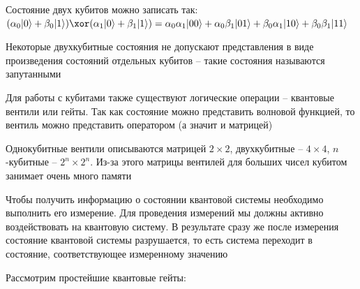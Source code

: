 \mediumvspace

Состояние двух кубитов можно записать так: $(\alpha_0 |0\rangle + \beta_0 |1\rangle) \xor (\alpha_1 |0\rangle + \beta_1 |1\rangle) = \alpha_0 \alpha_1 |00\rangle + \alpha_0 \beta_1 |01\rangle + \beta_0 \alpha_1 |10\rangle + \beta_0 \beta_1 |11\rangle$

Некоторые двухкубитные состояния не допускают представления в виде произведения состояний отдельных кубитов -- такие состояния называются запутанными


Для работы с кубитами также существуют логические операции -- квантовые вентили или гейты. Так как состояние можно представить волновой функцией, то вентиль можно представить оператором (а значит и матрицей)

Однокубитные вентили описываются матрицей $2 \times 2$, двухкубитные -- $4 \times 4$, $n$-кубитные -- $2^n \times 2^n$. Из-за этого матрицы вентилей для больших чисел кубитом занимает очень много памяти

Чтобы получить информацию о состоянии квантовой системы необходимо выполнить его измерение. Для проведения измерений мы должны активно воздействовать на квантовую систему. В результате сразу же после измерения состояние квантовой системы разрушается, 
то есть система переходит в состояние, соответствующее измеренному значению

\mediumvspace

Рассмотрим простейшие квантовые гейты:


